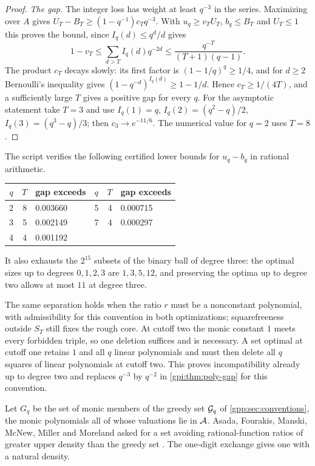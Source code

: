\begin{proof}
\emph{The gap.} The integer loss has weight at least $q^{-3}$ in the series. Maximizing over
$A$ gives $U_T-B_T\ge(1-q^{-1})c_Tq^{-3}$. With $u_q\ge v_TU_T$, $b_q\le B_T$ and $U_T\le1$
this proves the bound, since $I_q(d)\le q^d/d$ gives
\[
 1-v_T\le\sum_{d>T}I_q(d)q^{-2d}\le\frac{q^{-T}}{(T+1)(q-1)} .
\]
The product $c_T$ decays slowly: its first factor is $(1-1/q)^q\ge1/4$, and for $d\ge2$
Bernoulli's inequality gives $(1-q^{-d})^{I_q(d)}\ge1-1/d$. Hence $c_T\ge1/(4T)$, and a
sufficiently large $T$ gives a positive gap for every $q$. For the asymptotic statement take
$T=3$ and use $I_q(1)=q$, $I_q(2)=(q^2-q)/2$, $I_q(3)=(q^3-q)/3$; then $c_3\to e^{-11/6}$. The
numerical value for $q=2$ uses $T=8$.
\end{proof}

The script
verifies
the following certified lower bounds for $u_q-b_q$ in rational arithmetic.
\begin{center}\small
\begin{tabular}{crl@{\qquad}crl}\toprule
$q$&$T$&gap exceeds&$q$&$T$&gap exceeds\\\midrule
2&8&0.003660&5&4&0.000715\\
3&5&0.002149&7&4&0.000297\\
4&4&0.001192&&&\\\bottomrule
\end{tabular}
\end{center}
It also exhausts the $2^{15}$ subsets of the binary ball of degree three: the optimal sizes
up to degrees $0,1,2,3$ are $1,3,5,12$, and preserving the optima up to degree two allows at
most $11$ at degree three.

\begin{remark}\label{gpi:rem:poly-ratio}
The same separation holds when the ratio $r$ must be a nonconstant polynomial, with
admissibility for this convention in both optimizations; squarefreeness outside $S_T$ still
fixes the rough core. At cutoff two the monic constant $1$ meets every forbidden triple, so
one deletion suffices and is necessary. A set optimal at cutoff one retains $1$ and all $q$
linear polynomials and must then delete all $q$ squares of linear polynomials at cutoff two.
This proves incompatibility already up to degree two and replaces $q^{-3}$ by $q^{-2}$ in
\cref{gpi:thm:poly-gap} for this convention.
\end{remark}

Let $G_q$ be the set of monic members of the greedy set $\mathcal{G}_q$ of
\cref{gpp:sec:conventions}, the monic polynomials all of whose valuations lie in
$\mathcal{A}$. Asada, Fourakis, Manski, McNew, Miller and Moreland asked for a set avoiding
rational-function ratios of greater upper density than the greedy set
\cite[Question~6.4]{Asada2017Subsets}. The one-digit exchange gives one with a natural
density.

